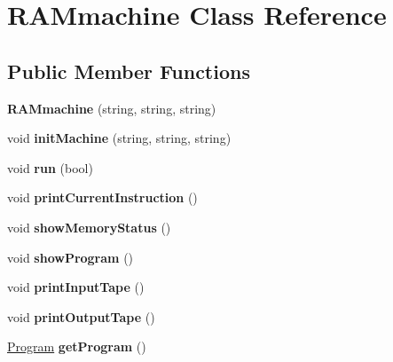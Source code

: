 \hypertarget{classRAMmachine}{\section{R\-A\-Mmachine Class Reference}
\label{classRAMmachine}
}
\subsection*{Public Member Functions}
\begin{DoxyCompactItemize}
\item 
\hypertarget{classRAMmachine_ad5ec54172e71b87c76f8a4b4d31e06bd}{{\bfseries R\-A\-Mmachine} (string, string, string)}\label{classRAMmachine_ad5ec54172e71b87c76f8a4b4d31e06bd}

\item 
\hypertarget{classRAMmachine_a42b4e5cc1c054c28011e00ab54c98bbf}{void {\bfseries init\-Machine} (string, string, string)}\label{classRAMmachine_a42b4e5cc1c054c28011e00ab54c98bbf}

\item 
\hypertarget{classRAMmachine_a4e5efa9b417958cd42f649f66e237710}{void {\bfseries run} (bool)}\label{classRAMmachine_a4e5efa9b417958cd42f649f66e237710}

\item 
\hypertarget{classRAMmachine_ade5769f9ae186bed299fa164d16ebc33}{void {\bfseries print\-Current\-Instruction} ()}\label{classRAMmachine_ade5769f9ae186bed299fa164d16ebc33}

\item 
\hypertarget{classRAMmachine_a94145ee5533985c15c38156069a7b67e}{void {\bfseries show\-Memory\-Status} ()}\label{classRAMmachine_a94145ee5533985c15c38156069a7b67e}

\item 
\hypertarget{classRAMmachine_a9d0a4de83f7bb48565f7abb370215ac0}{void {\bfseries show\-Program} ()}\label{classRAMmachine_a9d0a4de83f7bb48565f7abb370215ac0}

\item 
\hypertarget{classRAMmachine_ada124c82636c272ef71f82e5dec53a41}{void {\bfseries print\-Input\-Tape} ()}\label{classRAMmachine_ada124c82636c272ef71f82e5dec53a41}

\item 
\hypertarget{classRAMmachine_ac8fe4966b254a0663685d5d42521814c}{void {\bfseries print\-Output\-Tape} ()}\label{classRAMmachine_ac8fe4966b254a0663685d5d42521814c}

\item 
\hypertarget{classRAMmachine_a9ec0b4a2dac71d87bdfa662d1e0a11d6}{\hyperlink{classProgram}{Program} {\bfseries get\-Program} ()}\label{classRAMmachine_a9ec0b4a2dac71d87bdfa662d1e0a11d6}


\end{DoxyCompactItemize}
